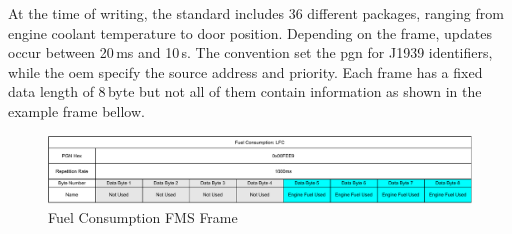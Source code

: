 At the time of writing, the standard includes 36 different packages, ranging from engine coolant temperature to door position.  Depending on the frame, updates occur between 20\,ms and 10\,s. The convention set the \acrfull{pgn} for J1939 identifiers, while the \acrshort{oem} specify the source address and priority. Each frame has a fixed data length of 8\,byte but not all of them contain information as shown in the example frame bellow.\cite{fms-standard-description}

\begin{figure}[h!]
	\centering
	\hfuzz=11.0pt
	\includegraphics[width=\textwidth]{images/fms-frame}
	\caption{Fuel Consumption FMS Frame}
	\label{fig:fms-frame}
\end{figure}

